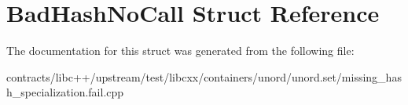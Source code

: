 \hypertarget{struct_bad_hash_no_call}{}\section{Bad\+Hash\+No\+Call Struct Reference}
\label{struct_bad_hash_no_call}


The documentation for this struct was generated from the following file\+:\begin{DoxyCompactItemize}
\item 
contracts/libc++/upstream/test/libcxx/containers/unord/unord.\+set/missing\+\_\+hash\+\_\+specialization.\+fail.\+cpp\end{DoxyCompactItemize}
